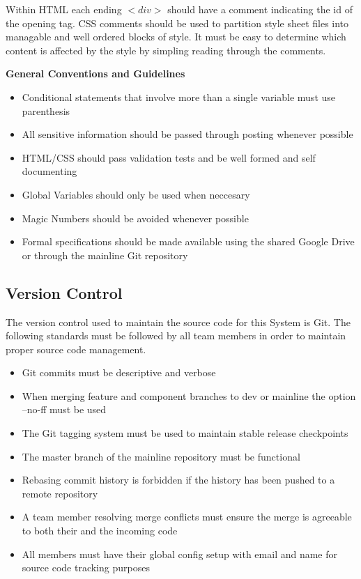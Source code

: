 \documentclass[12pt]{IEEEtran}
\begin{document}
	Within HTML each ending $<div>$ should have a comment indicating the id of the opening tag. CSS comments should be used to partition style sheet files into managable and well ordered blocks of style. It 			must be easy to determine which content is affected by the style by simpling reading through the comments.

	\bfseries General Conventions and Guidelines  \mdseries

	\begin{itemize}
		\item Conditional statements that involve more than a single variable must use parenthesis
		\item All sensitive information should be passed through posting whenever possible
		\item HTML/CSS should pass validation tests and be well formed and self documenting
		\item Global Variables should only be used when neccesary
		\item Magic Numbers should be avoided whenever possible 
		\item Formal specifications should be made available using the shared Google Drive or through the mainline Git repository
	\end{itemize}

\subsection{Version Control}
\label{subsec:git}

	The version control used to maintain the source code for this System is Git. The following standards must be followed by all team members in order to maintain proper source code management.
	\begin{itemize}
		\item Git commits must be descriptive and verbose
		\item When merging feature and component branches to dev or mainline the option --no-ff must be used
		\item The Git tagging system must be used to maintain stable release checkpoints
		\item The master branch of the mainline repository must be functional
		\item Rebasing commit history is forbidden if the history has been pushed to a remote repository
		\item A team member resolving merge conflicts must ensure the merge is agreeable to both their and the incoming code
		\item All members must have their global config setup with email and name for source code tracking purposes
	\end{itemize}
	
\end{document}
